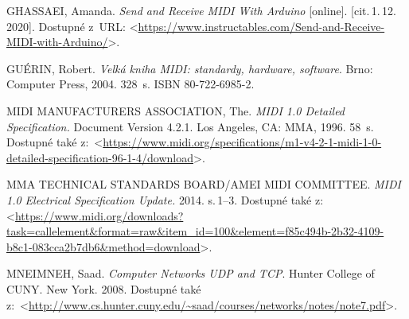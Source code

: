

\begin{thebibliography}{99}

    GHASSAEI, Amanda. \emph{Send and Receive MIDI With Arduino}\/ [online]. [cit.\,1.\,12.\,2020]. Dostupné z~URL: <\url{https://www.instructables.com/Send-and-Receive-MIDI-with-Arduino/}>.

    GUÉRIN, Robert. \emph{Velká kniha MIDI: standardy, hardware, software}. Brno: Computer Press, 2004. 328~s. ISBN 80-722-6985-2.

    MIDI MANUFACTURERS ASSOCIATION, The. \emph{MIDI 1.0 Detailed Specification.} Document Version 4.2.1. Los Angeles, CA: MMA, 1996. 58~s. Dostupné také z:~<\url{https://www.midi.org/specifications/m1-v4-2-1-midi-1-0-detailed-specification-96-1-4/download}>.

    MMA TECHNICAL STANDARDS BOARD/AMEI MIDI COMMITTEE. \emph{MIDI 1.0 Electrical Specification Update.} 2014. s.\,1--3. Dostupné také z:\\<\url{https://www.midi.org/downloads?task=callelement&format=raw&item_id=100&element=f85c494b-2b32-4109-b8c1-083cca2b7db6&method=download}>.

    MNEIMNEH, Saad. \emph{Computer Networks UDP and TCP}. Hunter College of CUNY. New York. 2008. Dostupné také z:~<\url{http://www.cs.hunter.cuny.edu/~saad/courses/networks/notes/note7.pdf}>.




	




\end{thebibliography}
